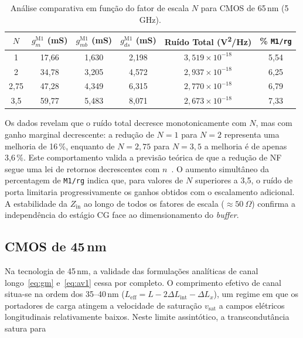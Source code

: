 \begin{table}[H]
\centering
\caption{Análise comparativa em função do fator de escala $N$ para CMOS de 65\,nm (5\,GHz).}
\label{tab:comp65}
\begin{tabular}{cccccc}
\hline
$N$ & $g_m^{\text{M1}}$ (mS) & $g_{mb}^{\text{M1}}$ (mS) & $g_{ds}^{\text{M1}}$ (mS) &
Ruído Total (V\textsuperscript{2}/Hz) & \% \texttt{M1/rg} \\
\hline
1     & 17{,}66 & 1{,}630 & 2{,}198 & $3{,}519 \times 10^{-18}$ & 5{,}54 \\
2     & 34{,}78 & 3{,}205 & 4{,}572 & $2{,}937 \times 10^{-18}$ & 6{,}25 \\
2{,}75 & 47{,}28 & 4{,}349 & 6{,}315 & $2{,}770 \times 10^{-18}$ & 6{,}79 \\
3{,}5 & 59{,}77 & 5{,}483 & 8{,}071 & $2{,}673 \times 10^{-18}$ & 7{,}33 \\
\hline
\end{tabular}
\end{table}

Os dados revelam que o ruído total decresce monotonicamente com $N$, mas com ganho marginal
decrescente: a redução de $N=1$ para $N=2$ representa uma melhoria de 16\,\%, enquanto de $N=2{,}75$
para $N=3{,}5$ a melhoria é de apenas 3{,}6\,\%. Este comportamento valida a previsão teórica de que
a redução de NF segue uma lei de retornos decrescentes com $n$~\cite{blaakmeer2008}. O aumento
simultâneo da percentagem de \texttt{M1/rg} indica que, para valores de $N$ superiores a 3{,}5, o
ruído de porta limitaria progressivamente os ganhos obtidos com o escalamento adicional. A estabilidade
da $Z_{\text{in}}$ ao longo de todos os fatores de escala ($\approx 50~\Omega$) confirma a
independência do estágio CG face ao dimensionamento do \textit{buffer}.

\subsection{CMOS de 45\,nm}

Na tecnologia de 45\,nm, a validade das formulações analíticas de canal longo~\eqref{eq:gm}
e~\eqref{eq:av1} cessa por completo. O comprimento efetivo de canal situa-se na ordem dos 35--40\,nm
($L_{\text{eff}} = L - 2\Delta L_{\text{int}} - \Delta L_x$), um regime em que os portadores de
carga atingem a velocidade de saturação $v_{\text{sat}}$ a campos elétricos longitudinais
relativamente baixos. Neste limite assintótico, a transcondutância satura para

